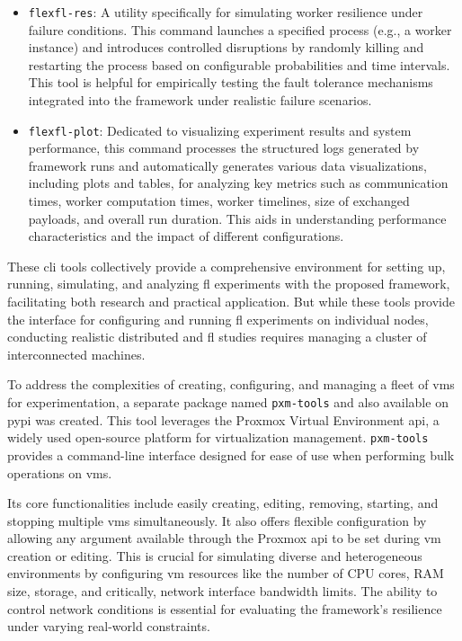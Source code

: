 \begin{itemize}
    \item \texttt{flexfl-res}: A utility specifically for simulating worker resilience under failure conditions. This command launches a specified process (e.g., a worker instance) and introduces controlled disruptions by randomly killing and restarting the process based on configurable probabilities and time intervals. This tool is helpful for empirically testing the fault tolerance mechanisms integrated into the framework under realistic failure scenarios.
    \item \texttt{flexfl-plot}: Dedicated to visualizing experiment results and system performance, this command processes the structured logs generated by framework runs and automatically generates various data visualizations, including plots and tables, for analyzing key metrics such as communication times, worker computation times, worker timelines, size of exchanged payloads, and overall run duration. This aids in understanding performance characteristics and the impact of different configurations.
\end{itemize}

These \ac{cli} tools collectively provide a comprehensive environment for setting up, running, simulating, and analyzing \ac{fl} experiments with the proposed framework, facilitating both research and practical application. But while these tools provide the interface for configuring and running \ac{fl} experiments on individual nodes, conducting realistic distributed and \ac{fl} studies requires managing a cluster of interconnected machines. 

To address the complexities of creating, configuring, and managing a fleet of \acp{vm} for experimentation, a separate package named \texttt{pxm-tools} and also available on \ac{pypi} was created. This tool leverages the Proxmox Virtual Environment \ac{api}, a widely used open-source platform for virtualization management. \texttt{pxm-tools} provides a command-line interface designed for ease of use when performing bulk operations on \acp{vm}. 

Its core functionalities include easily creating, editing, removing, starting, and stopping multiple \acp{vm} simultaneously. It also offers flexible configuration by allowing any argument available through the Proxmox \ac{api} to be set during \ac{vm} creation or editing. This is crucial for simulating diverse and heterogeneous environments by configuring \ac{vm} resources like the number of CPU cores, RAM size, storage, and critically, network interface bandwidth limits. The ability to control network conditions is essential for evaluating the framework's resilience under varying real-world constraints. 

